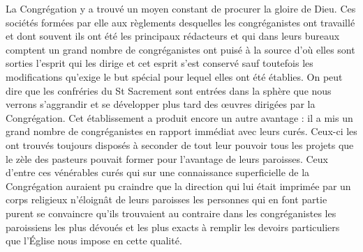 La Congrégation y a trouvé un moyen constant de procurer la gloire de Dieu. Ces sociétés formées par elle aux règlements desquelles les congréganistes ont travaillé et dont souvent ils ont été les principaux rédacteurs et qui dans leurs bureaux comptent un grand nombre de congréganistes ont puisé à la source d'où elles sont sorties l'esprit qui les dirige et cet esprit s'est conservé sauf toutefois les modifications qu'exige le but spécial pour lequel elles ont été établies. On peut dire que les confréries du St Sacrement sont entrées dans la sphère que nous verrons s'aggrandir et se développer plus tard des œuvres dirigées par la Congrégation.
Cet établissement a produit encore un autre avantage : il a mis un grand nombre de congréganistes en rapport immédiat avec leurs curés. Ceux-ci les ont trouvés toujours disposés à seconder de tout leur pouvoir tous les projets que le zèle des pasteurs pouvait former pour l'avantage de leurs paroisses. Ceux d'entre ces vénérables curés qui sur une connaissance superficielle de la Congrégation auraient pu craindre que la direction qui lui était imprimée par un corps religieux n'éloignât de leurs paroisses les personnes qui en font partie purent se convaincre qu'ils trouvaient au contraire dans les congréganistes les paroissiens les plus dévoués et les plus exacts à remplir les devoirs particuliers que l'Église nous impose en cette qualité.

